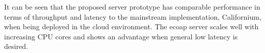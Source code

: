 It can be seen that the proposed server prototype has comparable performance in terms of throughput and latency to the mainstream implementation, Californium, when being deployed in the cloud environment. The ecoap server scales well with increasing CPU cores and shows an advantage when general low latency is desired.







